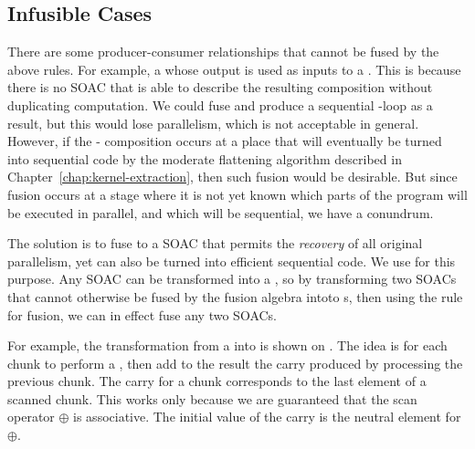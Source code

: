 \begin{description}
\end{description}

\subsection{Infusible Cases}
\label{sec:streamseq-fusion}

There are some producer-consumer relationships that cannot be fused by
the above rules.  For example, a  whose output is used as
inputs to a .  This is because there is no SOAC that is able
to describe the resulting composition without duplicating computation.
We could fuse and produce a sequential -loop as a result, but
this would lose parallelism, which is not acceptable in general.
However, if the - composition occurs at a place
that will eventually be turned into sequential code by the moderate
flattening algorithm described in
Chapter~\ref{chap:kernel-extraction}, then such fusion would be
desirable.  But since fusion occurs at a stage where it is not yet
known which parts of the program will be executed in parallel, and
which will be sequential, we have a conundrum.

The solution is to fuse to a SOAC that permits the \textit{recovery}
of all original parallelism, yet can also be turned into efficient
sequential code.  We use \StreamSeq{} for this purpose.  Any SOAC can
be transformed into a \StreamSeq{}, so by transforming two SOACs that
cannot otherwise be fused by the fusion algebra intoto \StreamSeq{}s,
then using the rule for \StreamSeq{} fusion, we can in effect fuse any
two SOACs.

For example, the transformation from a  into \StreamSeq{}
is shown on .  The idea is for each
chunk to perform a , then add to the result the carry
produced by processing the previous chunk.  The carry for a chunk
corresponds to the last element of a scanned chunk.  This works only
because we are guaranteed that the scan operator $\oplus$ is
associative.  The initial value of the carry is the neutral element
for $\oplus$.

